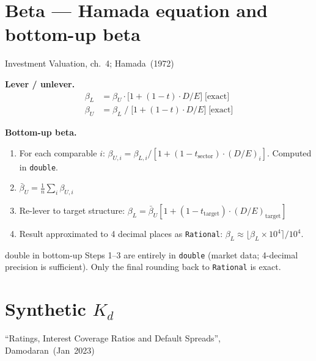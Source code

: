 \documentclass[11pt, a4paper, oneside]{article}
\newcommand{\exact}{\;\text{[exact]}}
\newcommand{\dbl}{\;\text{[double]}}
\begin{document}
\section{Beta --- Hamada equation and bottom-up beta}
\label{sec:beta}

\begin{damodaran}{Investment Valuation, ch.~4; Hamada~(1972)}
\end{damodaran}

\textbf{Lever / unlever.}
\begin{align}
  \beta_L &= \beta_U \cdot \bigl[1 + (1-t)\cdot D/E\bigr] \exact
  \label{eq:lever}\\
  \beta_U &= \beta_L \;\big/\; \bigl[1 + (1-t)\cdot D/E\bigr] \exact
  \label{eq:unlever}
\end{align}

\textbf{Bottom-up beta.}
\begin{enumerate}[leftmargin=*]
  \item For each comparable $i$: $\beta_{U,i} = \beta_{L,i} / [1+(1-t_\text{sector})\cdot(D/E)_i]$. Computed in \texttt{double}.
  \item $\bar\beta_U = \tfrac{1}{n}\sum_i \beta_{U,i}$ \dbl
  \item Re-lever to target structure: $\beta_L = \bar\beta_U [1+(1-t_\text{target})\cdot(D/E)_\text{target}]$ \dbl
  \item Result approximated to 4 decimal places as \texttt{Rational}:
        $\beta_L \approx \lfloor \beta_L \times 10^4 \rceil / 10^4$.
\end{enumerate}

\begin{impl}{double in bottom-up}
Steps 1--3 are entirely in \texttt{double} (market data; 4-decimal precision
is sufficient). Only the final rounding back to \texttt{Rational} is exact.
\end{impl}

\section{Synthetic \texorpdfstring{$K_d$}{Kd}}
\label{sec:kd}

\begin{damodaran}{``Ratings, Interest Coverage Ratios and Default Spreads'', Damodaran~(Jan~2023)}
\end{damodaran}
\end{document}

